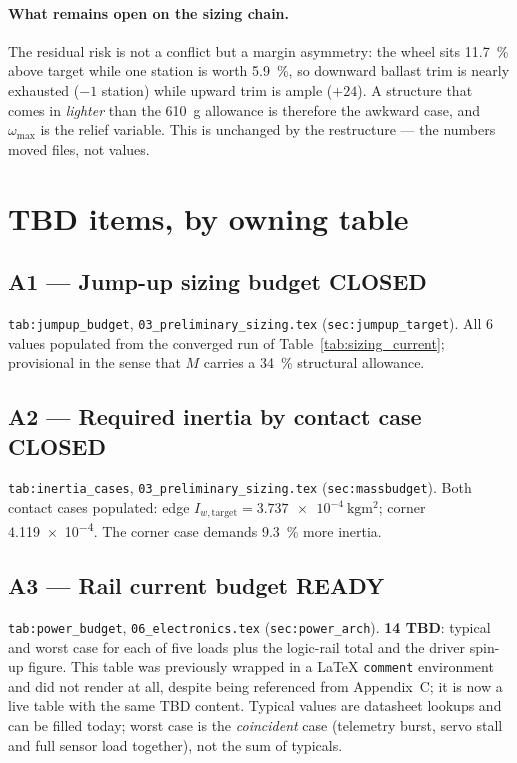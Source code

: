\documentclass[11pt,a4paper]{article}
\newcommand{\ready}{\textcolor{readycol}{\textbf{READY}}}
\newcommand{\closed}{\textcolor{closedcol}{\textbf{CLOSED}}}
\begin{document}
\paragraph{What remains open on the sizing chain.} The residual risk is not a
conflict but a margin asymmetry: the wheel sits \qty{11.7}{\percent} above
target while one station is worth \qty{5.9}{\percent}, so downward ballast trim
is nearly exhausted ($-1$ station) while upward trim is ample ($+24$). A
structure that comes in \emph{lighter} than the \qty{610}{\gram} allowance is
therefore the awkward case, and $\omega_{\max}$ is the relief variable. This is
unchanged by the restructure --- the numbers moved files, not values.

\clearpage
\section{TBD items, by owning table}
\label{sec:tbd}

\subsection{A1 --- Jump-up sizing budget \quad \closed}

\texttt{tab:jumpup\_budget}, \texttt{03\_preliminary\_sizing.tex}
(\texttt{sec:jumpup\_target}). All 6 values populated from the converged run
of Table~\ref{tab:sizing_current}; provisional in the sense that $M$ carries a
\qty{34}{\percent} structural allowance.

\subsection{A2 --- Required inertia by contact case \quad \closed}

\texttt{tab:inertia\_cases}, \texttt{03\_preliminary\_sizing.tex}
(\texttt{sec:massbudget}). Both contact cases populated: edge
$I_{w,\text{target}} = \qty{3.737e-4}{\kilogram\metre\squared}$; corner
\qty{4.119e-4}{}. The corner case demands \qty{9.3}{\percent} more inertia.

\subsection{A3 --- Rail current budget \quad \ready}

\texttt{tab:power\_budget}, \texttt{06\_electronics.tex}
(\texttt{sec:power\_arch}). \textbf{14 TBD}: typical and worst case for each of
five loads plus the logic-rail total and the driver spin-up figure. This table
was previously wrapped in a LaTeX \texttt{comment} environment and did not
render at all, despite being referenced from Appendix~C; it is now a live
table with the same TBD content. Typical values are datasheet lookups and can
be filled today; worst case is the \emph{coincident} case (telemetry burst,
servo stall and full sensor load together), not the sum of typicals.
\end{document}
